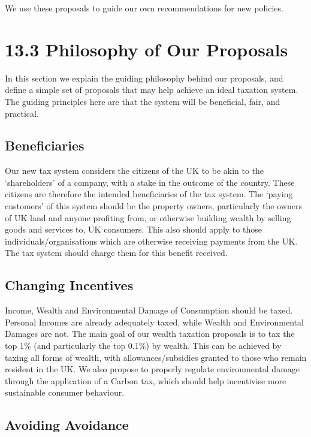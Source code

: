 \documentclass[]{tufte-handout}
\begin{document}
We use these proposals to guide our own recommendations for new
policies.

\hypertarget{philosophy-of-our-proposals}{%
\section{13.3 Philosophy of Our
Proposals}\label{philosophy-of-our-proposals}}

In this section we explain the guiding philosophy behind our proposals,
and define a simple set of proposals that may help achieve an ideal
taxation system. The guiding principles here are that the system will be
beneficial, fair, and practical.

\hypertarget{beneficiaries}{%
\subsection{Beneficiaries}\label{beneficiaries}}

Our new tax system considers the citizens of the UK to be akin to the
`shareholders' of a company, with a stake in the outcome of the country.
These citizens are therefore the intended beneficiaries of the tax
system. The `paying customers' of this system should be the property
owners, particularly the owners of UK land and anyone profiting from, or
otherwise building wealth by selling goods and services to, UK
consumers. This also should apply to those individuals/organisations
which are otherwise receiving payments from the UK. The tax system
should charge them for this benefit received.

\hypertarget{changing-incentives}{%
\subsection{Changing Incentives}\label{changing-incentives}}

Income, Wealth and Environmental Damage of Consumption should be taxed.
Personal Incomes are already adequately taxed, while Wealth and
Environmental Damages are not. The main goal of our wealth taxation
proposals is to tax the top 1\% (and particularly the top 0.1\%) by
wealth. This can be achieved by taxing all forms of wealth, with
allowances/subsidies granted to those who remain resident in the UK. We
also propose to properly regulate environmental damage through the
application of a Carbon tax, which should help incentivise more
sustainable consumer behaviour.

\hypertarget{avoiding-avoidance}{%
\subsection{Avoiding Avoidance}\label{avoiding-avoidance}}
\end{document}
